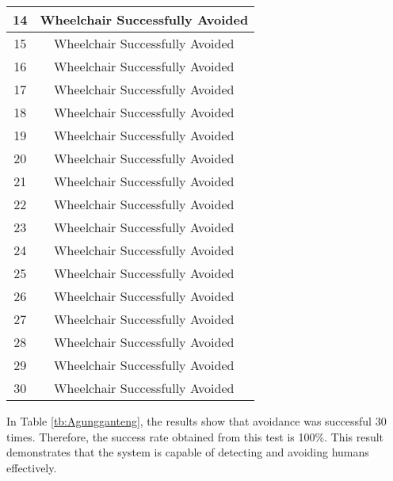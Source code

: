 \begin{table}[H]
\begin{tabular}{|c|c|}
    14        & \cellcolor[HTML]{9AFF99}Wheelchair Successfully Avoided              \\ \hline
    15        & \cellcolor[HTML]{9AFF99}Wheelchair Successfully Avoided              \\ \hline
    16        & \cellcolor[HTML]{9AFF99}Wheelchair Successfully Avoided              \\ \hline
    17        & \cellcolor[HTML]{9AFF99}Wheelchair Successfully Avoided              \\ \hline
    18        & \cellcolor[HTML]{9AFF99}Wheelchair Successfully Avoided              \\ \hline
    19        & \cellcolor[HTML]{9AFF99}Wheelchair Successfully Avoided              \\ \hline
    20        & \cellcolor[HTML]{9AFF99}Wheelchair Successfully Avoided              \\ \hline
    21        & \cellcolor[HTML]{9AFF99}Wheelchair Successfully Avoided              \\ \hline
    22        & \cellcolor[HTML]{9AFF99}Wheelchair Successfully Avoided              \\ \hline
    23        & \cellcolor[HTML]{9AFF99}Wheelchair Successfully Avoided              \\ \hline
    24        & \cellcolor[HTML]{9AFF99}Wheelchair Successfully Avoided              \\ \hline
    25        & \cellcolor[HTML]{9AFF99}Wheelchair Successfully Avoided              \\ \hline
    26        & \cellcolor[HTML]{9AFF99}Wheelchair Successfully Avoided              \\ \hline
    27        & \cellcolor[HTML]{9AFF99}Wheelchair Successfully Avoided              \\ \hline
    28        & \cellcolor[HTML]{9AFF99}Wheelchair Successfully Avoided              \\ \hline
    29        & \cellcolor[HTML]{9AFF99}Wheelchair Successfully Avoided              \\ \hline
    30        & \cellcolor[HTML]{9AFF99}Wheelchair Successfully Avoided              \\ \hline
    \end{tabular}
    \end{table}

In Table \ref{tb:Agungganteng}, the results show that avoidance was successful 30 times. Therefore, the success rate obtained from this test is 100\%. This result demonstrates that the system is capable of detecting and avoiding humans effectively.

